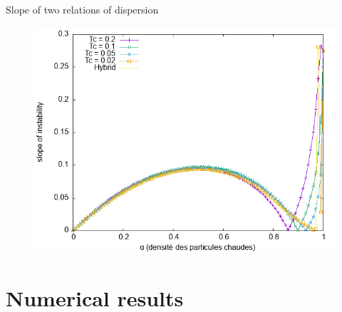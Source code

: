 \documentclass{beamer}
\begin{document}
\begin{frame}{Slope of two relations of dispersion}
  \begin{figure}\centering
    \includegraphics[height=0.8\textheight]{img/limit_slope_alpha.png}
  \end{figure}
\end{frame}

\section{Numerical results}
\end{document}
